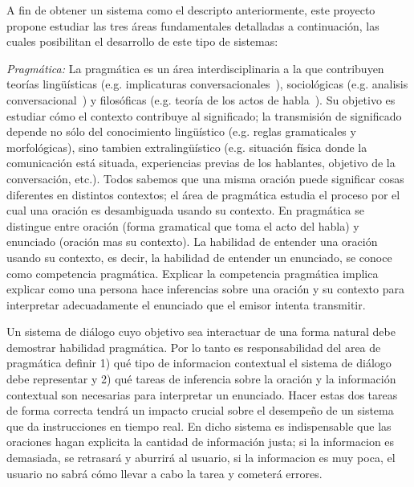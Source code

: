 A fin de obtener un sistema como el descripto anteriormente, este proyecto propone estudiar las tres \'areas fundamentales detalladas a continuaci\'on, las cuales posibilitan el desarrollo de este tipo de sistemas:
\begin{myitemize}
  \item \emph{Pragm\'atica:} La pragm\'atica es un \'area interdisciplinaria a
la que contribuyen teor\'ias ling\"u\'isticas (e.g. implicaturas
conversacionales~\citep{Grice75}), sociol\'ogicas (e.g. analisis
conversacional~\citep{schegloff87b}) y filos\'oficas (e.g. teor\'ia de los actos
de habla~\citep{austin62}). Su objetivo es estudiar c\'omo el contexto
contribuye al significado; la transmisi\'on de significado depende no s\'olo del
conocimiento ling\"u\'istico (e.g. reglas gramaticales y morfol\'ogicas), sino
tambien extraling\"u\'istico (e.g. situaci\'on f\'isica donde la comunicaci\'on
est\'a situada, experiencias previas de los hablantes, objetivo de la
conversaci\'on, etc.). Todos sabemos que una misma oraci\'on puede significar
cosas diferentes en distintos contextos; el \'area de pragm\'atica estudia el
proceso por el cual una oraci\'on es desambiguada usando su contexto. En
pragm\'atica se distingue entre oraci\'on (forma
gramatical que toma el acto del habla) y enunciado (oraci\'on mas su contexto).
La habilidad de entender una oraci\'on usando su contexto, es decir, la
habilidad de entender un enunciado, se conoce como competencia pragm\'atica.
Explicar la competencia pragm\'atica implica explicar como una persona hace
inferencias sobre una oraci\'on y su contexto para interpretar adecuadamente el
enunciado que el emisor intenta transmitir.

Un sistema de di\'alogo cuyo objetivo sea interactuar de una forma natural debe
demostrar habilidad pragm\'atica. Por lo tanto es responsabilidad del area de
pragm\'atica definir 1) qu\'e tipo de informacion contextual el sistema de
di\'alogo debe representar y 2) qu\'e tareas de inferencia sobre la oraci\'on y
la informaci\'on contextual son necesarias para interpretar un enunciado. Hacer
estas dos tareas de forma correcta tendr\'a un impacto crucial sobre el
desempe\~no de un sistema que da instrucciones en tiempo real. En dicho sistema
es indispensable que las oraciones hagan explicita la cantidad de informaci\'on
justa; si la informacion es demasiada, se retrasar\'a y aburrir\'a al usuario,
si la informacion es muy poca, el usuario no sabr\'a c\'omo llevar a cabo la
tarea y cometer\'a errores.


%
%


\end{myitemize}
